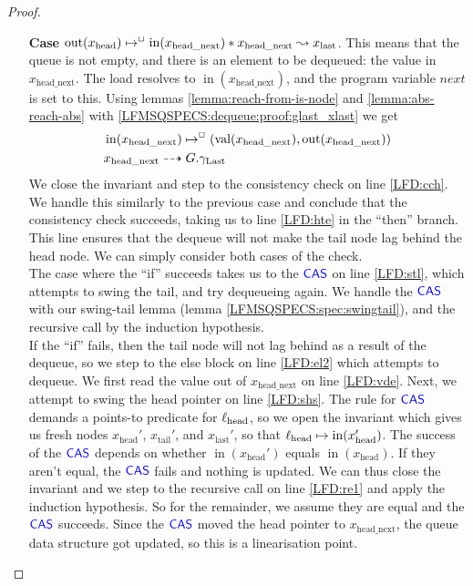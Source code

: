 \documentclass[a4paper, 10pt]{report}
\theoremstyle{definition}
\newcommand{\locN}[1]{\loc_{\mathrm{#1}}}
\newcommand{\lochead}{\locN{head}}
\newcommand{\nIn}[1]{\operatorname{in}(#1)}
\newcommand{\nVal}[1]{\operatorname{val}(#1)}
\newcommand{\nOut}[1]{\operatorname{out}(#1)}
\newcommand{\node}{x}
\newcommand{\nodeN}[1]{\node_{\mathrm{#1}}}
\newcommand{\nodehead}{\nodeN{head}}
\newcommand{\nodetail}{\nodeN{tail}}
\newcommand{\nodelast}{\nodeN{last}}
\newcommand{\nodeheadnext}{\nodeN{head\_next}}
\newcommand{\Qg}{G}
\newcommand{\glast}{\gname_{\mathrm{Last}}}
\newcommand{\isNode}[1]{\nIn{#1} \mapsto^{\persistently} (\nVal{#1}, \nOut{#1})}
\newcommand{\reach}[2]{#1 \leadsto #2}
\newcommand{\ar}[2]{#1 \dashrightarrow #2}
\begin{document}
\begin{proof}
\begin{itemize}
\begin{itemize}
      \item[\textbf{Case}] $\nOut{\nodehead} \mapsto^{\persistently} \nIn{\nodeheadnext} \star{} \reach{\nodeheadnext}{\nodelast}$. This means that the queue is not empty, and there is an element to be dequeued: the value in $\nodeheadnext$. The load resolves to $\nIn{\nodeheadnext}$, and the program variable $next$ is set to this. Using lemmas \ref{lemma:reach-from-is-node} and \ref{lemma:abs-reach-abs} with \ref{LFMSQSPECS:dequeue:proof:glast_xlast} we get
      \begin{align}
        &\isNode{\nodeheadnext}\label{LFMSQSPECS:dequeue:proof:x_headnext_node}\\
        &\ar{\nodeheadnext}{\Qg.\glast}\label{LFMSQSPECS:dequeue:proof:x_headnext_glast}
      \end{align}
      We close the invariant and step to the consistency check on line \ref{LFD:cch}. We handle this similarly to the previous case and conclude that the consistency check succeeds, taking us to line \ref{LFD:hte} in the ``then'' branch. This line ensures that the dequeue will not make the tail node lag behind the head node. We can simply consider both cases of the check.\\
      The case where the ``if'' succeeds takes us to the $\textsf{\color{blue} CAS}$ on line \ref{LFD:stl}, which attempts to swing the tail, and try dequeueing again. We handle the $\textsf{\color{blue} CAS}$ with our swing-tail lemma (lemma \ref{LFMSQSPECS:spec:swingtail}), and the recursive call by the induction hypothesis.\\
      If the ``if'' fails, then the tail node will not lag behind as a result of the dequeue, so we step to the else block on line \ref{LFD:el2} which attempts to dequeue. We first read the value out of $\nodeheadnext$ on line \ref{LFD:vde}. Next, we attempt to swing the head pointer on line \ref{LFD:shs}. The rule for $\textsf{\color{blue} CAS}$ demands a points-to predicate for $\lochead$, so we open the invariant which gives us fresh nodes $\nodehead'$, $\nodetail'$, and $\nodelast'$, so that $\lochead \mapsto \nIn{\nodehead'}$. The success of the $\textsf{\color{blue} CAS}$ depends on whether $\nIn{\nodehead'}$ equals $\nIn{\nodehead}$. If they aren't equal, the $\textsf{\color{blue} CAS}$ fails and nothing is updated. We can thus close the invariant and we step to the recursive call on line \ref{LFD:re1} and apply the induction hypothesis. So for the remainder, we assume they are equal and the $\textsf{\color{blue} CAS}$ succeeds. Since the $\textsf{\color{blue} CAS}$ moved the head pointer to $\nodeheadnext$, the queue data structure got updated, so this is a linearisation point.\\

\end{itemize}
\end{itemize}
\end{proof}
\end{document}
